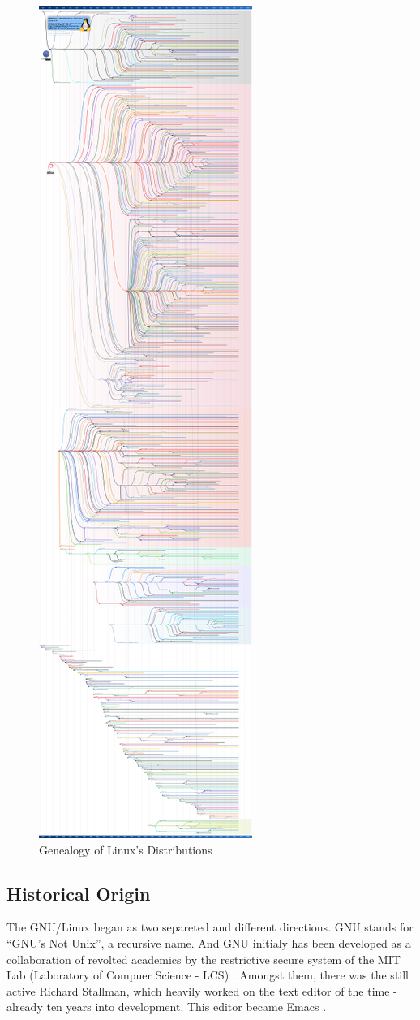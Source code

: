 \documentclass[
12pt,				%
openright,			%
oneside,			%
a4paper,			%
brazil,				%
english,			%
]{abntex2}
\begin{document}
\begin{figure}[!htb]
  \caption{\label{fig:linux-genealogy} Genealogy of Linux's Distributions}
  \includegraphics[height=\textwidth, angle=-90]{diversidade}
\end{figure}


\subsection{\label{sec:linux-origin}Historical Origin}

The GNU/Linux began as two separeted and different directions. GNU
stands for ``GNU's Not Unix'', a recursive name. And GNU initialy has
been developed as a collaboration of revolted academics by the
restrictive secure system of the MIT Lab (Laboratory of Compuer
Science - LCS) \cite{stallman2002my,emacswiki2021history}. Amongst
them, there was the still active Richard Stallman, which heavily
worked on the text editor of the time - already ten years into
development. This editor became Emacs \cite{emacswiki2021history}.   
\end{document}
